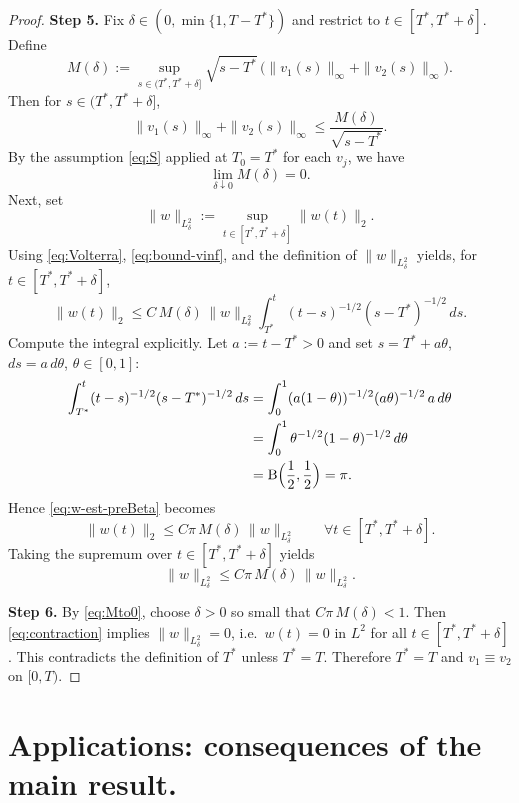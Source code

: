 \documentclass[12pt]{article}
\theoremstyle{remark}
\theoremstyle{remark}
\begin{document}
\begin{proof}
\textbf{Step 5.}
Fix $\delta\in(0,\min\{1,T-T^*\})$ and restrict to $t\in[T^*,T^*+\delta]$. Define
\begin{equation}\label{eq:Mdelta}
M(\delta):=\sup_{s\in(T^*,T^*+\delta]}\sqrt{s-T^*}\,\bigl(\|v_1(s)\|_\infty+\|v_2(s)\|_\infty\bigr).
\end{equation}
Then for $s\in(T^*,T^*+\delta]$,
\begin{equation}\label{eq:bound-vinf}
\|v_1(s)\|_\infty+\|v_2(s)\|_\infty\le \frac{M(\delta)}{\sqrt{s-T^*}}.
\end{equation}
By the assumption \eqref{eq:S} applied at $T_0=T^*$ for each $v_j$, we have
\begin{equation}\label{eq:Mto0}
\lim_{\delta\downarrow 0} M(\delta)=0.
\end{equation}
Next, set
\[
\|w\|_{L^2_\delta}:=\sup_{t\in[T^*,T^*+\delta]}\|w(t)\|_2.
\]
Using \eqref{eq:Volterra}, \eqref{eq:bound-vinf}, and the definition of $\|w\|_{L^2_\delta}$ yields, for $t\in[T^*,T^*+\delta]$,
\begin{equation}\label{eq:w-est-preBeta}
\|w(t)\|_2
\le C\,M(\delta)\,\|w\|_{L^2_\delta}\int_{T^*}^{t}(t-s)^{-1/2}(s-T^*)^{-1/2}\,ds.
\end{equation}
Compute the integral explicitly. Let $a:=t-T^*>0$ and set $s=T^*+a\theta$, $ds=a\,d\theta$, $\theta\in[0,1]$:
\begin{align*}
\int_{T^*}^{t}(t-s)^{-1/2}(s-T^*)^{-1/2}\,ds
&=\int_0^1 (a(1-\theta))^{-1/2}(a\theta)^{-1/2}\,a\,d\theta\\
&=\int_0^1 \theta^{-1/2}(1-\theta)^{-1/2}\,d\theta\\
&=\mathrm{B}\Bigl(\frac12,\frac12\Bigr)=\pi.
\end{align*}
Hence \eqref{eq:w-est-preBeta} becomes
\[
\|w(t)\|_2\le C\pi\,M(\delta)\,\|w\|_{L^2_\delta}\qquad\forall t\in[T^*,T^*+\delta].
\]
Taking the supremum over $t\in[T^*,T^*+\delta]$ yields
\begin{equation}\label{eq:contraction}
\|w\|_{L^2_\delta}\le C\pi\,M(\delta)\,\|w\|_{L^2_\delta}.
\end{equation}

\textbf{Step 6.}
By \eqref{eq:Mto0}, choose $\delta>0$ so small that $C\pi\,M(\delta)<1$. Then \eqref{eq:contraction} implies
$\|w\|_{L^2_\delta}=0$, i.e.\ $w(t)=0$ in $L^2$ for all $t\in[T^*,T^*+\delta]$.
This contradicts the definition of $T^*$ unless $T^*=T$. Therefore $T^*=T$ and $v_1\equiv v_2$ on $[0,T)$.
\end{proof}

\section{Applications: consequences of the main result.}
\label{sec:cor}
\end{document}

